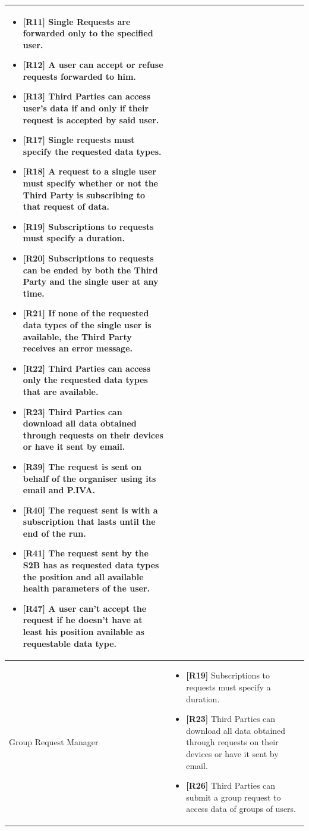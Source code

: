 \documentclass[titlepage]{article}
\begin{document}
\begin{longtable}{| p{5 cm} | p{8 cm} |}
\begin{itemize}
			\item {\bf [R11]} Single Requests are forwarded only to the specified user.
			\item {\bf [R12]} A user can accept or refuse requests forwarded to him. 
			\item {\bf [R13]} Third Parties can access user’s data if and only if their request is accepted by said user. 
			\item {\bf [R17]} Single requests must specify the requested data types. 
			\item {\bf [R18]} A request to a single user must specify whether or not the Third Party is subscribing to that request of data.
			\item {\bf [R19]} Subscriptions to requests must specify a duration.
			\item {\bf [R20]} Subscriptions to requests can be ended by both the Third Party and the single user at any time.
			\item {\bf [R21]} If none of the requested data types of the single user is available, the Third Party receives an error message.
			\item {\bf [R22]} Third Parties can access only the requested data types that are available.
			\item {\bf [R23]} Third Parties can download all data obtained through requests on their devices or have it sent by email.
			\item {\bf [R39]} The request is sent on behalf of the organiser using its email and P.IVA.
			\item {\bf [R40]} The request sent is with a subscription that lasts until the end of the run.
			\item {\bf [R41]} The request sent by the S2B has as requested data types the position and all available health parameters of the user.
			\item {\bf [R47]} A user can’t accept the request if he doesn’t have at least his position available as requestable data type.
		\end{itemize}		
		\\	 \hline	
		\newline Group Request Manager & 
		\begin{itemize}
			\item {\bf [R19]} Subscriptions to requests must specify a duration.
			\item {\bf [R23]} Third Parties can download all data obtained through requests on their devices or have it sent by email.
			\item {\bf [R26]} Third Parties can submit a group request to access data of groups of users. 

\end{itemize}
\end{longtable}
\end{document}
